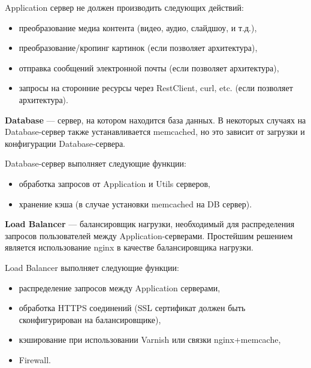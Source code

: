 \documentclass[10pt, a5paper]{article}
\begin{document}
Application сервер не должен производить следующих действий:
\begin{itemize}
\item преобразование медиа контента (видео, аудио, слайдшоу, и т.д.),
\item преобразование/кропинг картинок (если позволяет архитектура),
\item отправка сообщений электронной почты (если позволяет архитектура),
\item запросы на сторонние ресурсы через RestClient, curl, etc. (если позволяет архитектура).
\end{itemize}
{\bf Database} --- сервер, на котором находится база данных. В некоторых случаях на Database-сервер также устанавливается memcached, но это зависит от загрузки и конфигурации Database-сервера. 

Database-сервер выполняет следующие функции:
\begin{itemize}
\item обработка запросов от Application и Utils серверов,
\item хранение кэша (в случае установки memcached на DB сервер).
\end{itemize}
{\bf Load Balancer} --- балансировщик нагрузки, необходимый для распределения запросов пользователей между Application-серверами. Простейшим решением является использование nginx в качестве балансировщика нагрузки.

Load Balancer выполняет следующие функции:
\begin{itemize}
\item распределение запросов между Application серверами,
\item обработка HTTPS соединений (SSL сертификат должен быть сконфигурирован на балансировщике),
\item кэширование при использовании Varnish или связки nginx+memcache,
\item Firewall.
\end{itemize}
\end{document}
